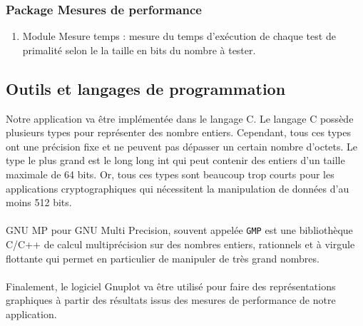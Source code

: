 		\subsubsection*{Package Mesures de performance}
			\begin{enumerate}[leftmargin=*]
				\item Module Mesure temps : mesure du temps d'exécution de chaque test de primalité selon le la taille en bits du nombre à tester.
			\end{enumerate}
	
	\subsection{Outils et langages de programmation}
	Notre application va être implémentée dans le langage {\ttfamily C}. Le langage {\ttfamily C} possède plusieurs types pour représenter des nombre entiers. Cependant, tous ces types ont une précision fixe et ne peuvent pas dépasser un certain nombre d'octets. Le type le plus grand est le {\ttfamily long long int} qui peut contenir des entiers d'un taille maximale de 64 bits. Or, tous ces types sont beaucoup trop courts pour les applications cryptographiques qui nécessitent la manipulation de données d'au moins 512 bits.
	\paragraph{}{\ttfamily GNU MP} pour {\ttfamily GNU Multi Precision}, souvent appelée \lstinline!GMP! est une bibliothèque {\ttfamily C}/{\ttfamily C++} de calcul multiprécision sur des nombres entiers, rationnels et à virgule flottante qui permet en particulier de manipuler de très grand nombres.
	
	\paragraph{} Finalement, le logiciel {\ttfamily Gnuplot} va être utilisé pour faire des représentations graphiques à partir des résultats issus des mesures de performance de notre application.
	